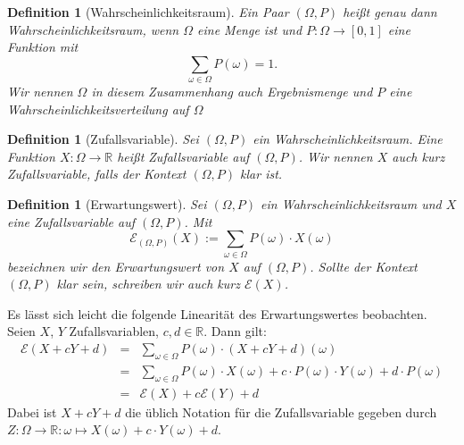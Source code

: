 \documentclass[a4paper]{article}
\newtheorem{definition}[satz]{Definition} %
\theoremstyle{nonumberplain}
\begin{document}
\newcommand{\probspace}{Wahr\-schein\-lich\-keits\-raum}
\newcommand{\probspaceexraw}{(\Omega, P)}
\newcommand{\probspaceex}{$(\Omega, P)$}
\begin{definition}[\probspace{}] \label{def-probspace}
	\hspace{1ex} Ein Paar \probspaceex{} heißt genau dann \probspace{}, wenn $\Omega$ eine Menge ist und $P : \Omega \to [0,1] $ eine Funktion mit
	\begin{equation}
		\sum_{\omega \in \Omega} P(\omega) = 1 \text{.}
	\end{equation} Wir nennen $\Omega$ in diesem Zusammenhang auch Ergebnismenge und $P$ eine Wahr\-schein\-lich\-keitsverteilung auf $\Omega$
\end{definition}
\newcommand{\rvar}{Zufallsvariable}
\begin{definition}[\rvar{}] \label{def-rvar}
	Sei \probspaceex{} ein \probspace{}. Eine Funktion $X : \Omega \to \mathbb{R}$ heißt \rvar{} auf \probspaceex{}. Wir nennen $X$ auch kurz \rvar{}, falls der Kontext \probspaceex{} klar ist.
\end{definition}
\newcommand{\expect}{Erwartungswert}
\begin{definition}[\expect{}] \label{def-expect}
	\hspace{1ex} Sei \probspaceex{} ein \probspace{} und $X$ eine \rvar{} auf \probspaceex{}. Mit
	\begin{equation}
		\mathcal{E}_{\probspaceexraw{}}(X) := \sum_{\omega \in \Omega}{P(\omega) \cdot X(\omega)}
	\end{equation}
	bezeichnen wir den \expect{} von $X$ auf \probspaceex{}. Sollte der Kontext \probspaceex{} klar sein, schreiben wir auch kurz $\mathcal{E}(X)$.
\end{definition}
Es lässt sich leicht die folgende Linearität des \expect{}es beobachten. Seien $X$, $Y$ Zufallsvariablen, $c,d \in \mathbb{R}$. Dann gilt:
\begin{align}
	\mathcal{E}(X + cY + d) & = & \sum_{\omega \in \Omega}{P(\omega) \cdot (X + cY + d)(\omega) } \nonumber \\
	& = & \sum_{\omega \in \Omega}{P(\omega) \cdot X(\omega) + c \cdot P(\omega) \cdot Y(\omega) + d \cdot P(\omega)} \nonumber \\
	& = & \mathcal{E}(X) + c \mathcal{E}(Y) + d \label{eq-linearity}
\end{align}
Dabei ist  $X + cY + d$ die üblich Notation für die \rvar{} gegeben durch $Z : \Omega \to \mathbb{R} : \omega \mapsto X(\omega) + c \cdot Y(\omega)+ d$.
\newcommand{\var}{Varianz}
\end{document}
